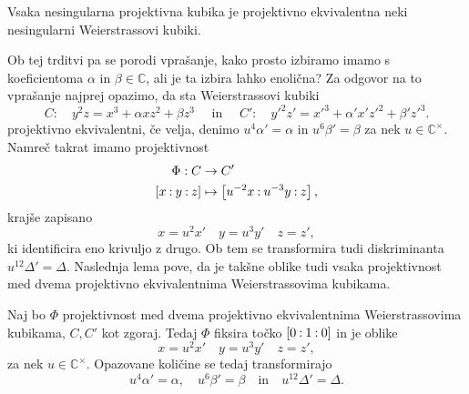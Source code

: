 \documentclass[mat1]{fmfdelo}
\numberwithin{equation}{section}
\newcommand{\C}{\mathbb C}
\newcommand{\CM}{\mathbb C ^\times}
\newcommand{\pcoor}[1]{%
\begingroup\lccode`~=`: \lowercase{\endgroup
\edef~}{\mathbin{\mathchar\the\mathcode`:}\nobreak}%
\left[%
\begingroup
\mathcode`:=\string"8000
#1%
\endgroup
\right]%
}
\theoremstyle{definition}
\begin{document}
\begin{trditev}
    \label{kubika izomorfna neki wnf}
    Vsaka nesingularna projektivna kubika je projektivno ekvivalentna neki nesingularni Weierstrassovi kubiki.  
\end{trditev}

\begin{dokaz}
    \cite[lemma 15.2]{Gibson}
\end{dokaz}

Ob tej trditvi pa se porodi vprašanje, kako prosto izbiramo imamo s koeficientoma $\alpha$ in $\beta \in \C$, ali je ta izbira lahko enolična? Za odgovor na to vprašanje najprej opazimo, da sta Weierstrassovi kubiki 
\[
    C: \quad y^2z = x^3 + \alpha xz^2 + \beta z^3 \quad \text{ in } \quad
    C': \quad y'^2z' = x'^3 + \alpha' x'z'^2 + \beta' z'^3. 
\]
projektivno ekvivalentni, če velja, denimo $u^4 \alpha' = \alpha$ in $u^6 \beta' = \beta$ za nek $u \in \CM$. Namreč takrat imamo projektivnost
\begin{align*}
    \Phi:C &\to C'\\
    \pcoor{x : y : z} &\mapsto \pcoor{u^{-2}x : u^{-3}y : z},
\end{align*}
krajše zapisano 
\[
    x = u^2 x' \quad y = u^3 y' \quad z = z',  
\]
ki identificira eno krivuljo z drugo. Ob tem se transformira tudi diskriminanta $u^{12} \Delta' = \Delta$. Naslednja lema pove, da je takšne oblike tudi vsaka projektivnost med dvema projektivno ekvivalentnima Weierstrassovima kubikama. 
        
\begin{lema}
    \label{projektivnosti wnf}
    Naj bo $\Phi$ projektivnost med dvema projektivno ekvivalentnima Weierstrassovima kubikama, $C, C'$ kot zgoraj. Tedaj $\Phi$ fiksira točko $\pcoor{0 : 1 : 0}$ in je oblike 
    \begin{equation}
        \label{eq:transformacija wnf}
        x = u^2 x' \quad y = u^3 y' \quad z = z',  
    \end{equation}
    za nek $u \in \CM$. Opazovane količine se tedaj transformirajo 
    \[
        u^4 \alpha' = \alpha, \quad u^6 \beta' = \beta \quad \text{in} \quad u^{12} \Delta' = \Delta.
    \]
\end{lema}
\end{document}
